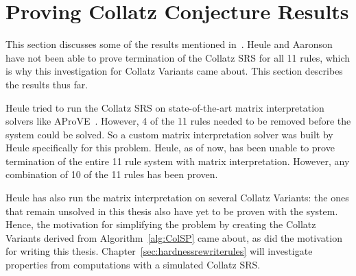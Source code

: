 \section{Proving Collatz Conjecture Results} \label{subsec:provingCollatzresults}
This section discusses some of the results mentioned in~\cite{HeuleAaronson}. Heule and Aaronson have not been able to prove termination of the Collatz SRS for all 11 rules, which is why this investigation for Collatz Variants came about. This section describes the results thus far. \par
Heule tried to run the Collatz SRS on state-of-the-art matrix interpretation solvers like AProVE~\cite{Giesletal:2004}. However, 4 of the 11 rules needed to be removed before the system could be solved. So a custom matrix interpretation solver was built by Heule specifically for this problem. 
Heule, as of now, has been unable to prove termination of the entire 11 rule system with matrix interpretation. However, any combination of 10 of the 11 rules has been proven. \par
Heule has also run the matrix interpretation on several Collatz Variants: the ones that remain unsolved in this thesis also have yet to be proven with the system. Hence, the motivation for simplifying the problem by creating the Collatz Variants derived from Algorithm~\ref{alg:ColSP} came about, as did the motivation for writing this thesis. Chapter~\ref{sec:hardnessrewriterules} will investigate properties from computations with a simulated Collatz SRS.
